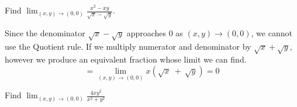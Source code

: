 \documentclass[12pt,a4paper,draft]{article}
\begin{document}
\newpage


\begin{example}
    Find \(\operatorname*{lim}_{(x,y)\to(0,0)}{\frac{x^{2}-x y}{\sqrt{x}-\sqrt{y}}}.\)
\end{example}
\begin{solution}
   Since the denominator \(\sqrt{x} - \sqrt{y}\) approaches 0 as \((x,y) \to (0,0)\), we cannot use the Quotient rule. If we multiply numerator and denominator by \(\sqrt{x} + \sqrt{y}\), however we produce an equivalent fraction whose limit we can find.
   \[=\operatorname*{lim}_{(x,y)\to(0,0)}x\left(\sqrt{x}\:+\:\sqrt{y}\right) = 0\]
\end{solution}


\begin{example}
    Find \(\lim _{(x, y) \rightarrow(0,0)} \frac{4 x y^2}{x^2+y^2}\)
\end{example}
\end{document}
